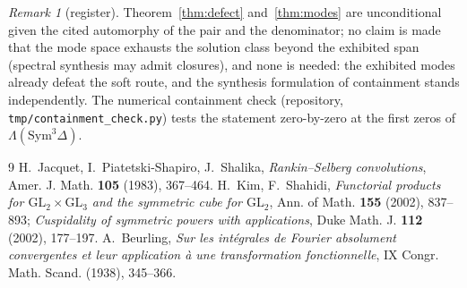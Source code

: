 \documentclass[11pt]{article}
\theoremstyle{remark}
\newtheorem{remark}[theorem]{Remark}
\newcommand{\Sym}{\mathrm{Sym}}
\begin{document}
\begin{remark}[register]
Theorem~\ref{thm:defect} and~\ref{thm:modes} are unconditional given the
cited automorphy of the pair and the denominator; no claim is made that the
mode space exhausts the solution class beyond the exhibited span (spectral
synthesis may admit closures), and none is needed: the exhibited modes
already defeat the soft route, and the synthesis formulation of containment
stands independently.  The numerical containment check (repository,
\texttt{tmp/containment\_check.py}) tests the statement zero-by-zero at the
first zeros of $\Lambda(\Sym^3\Delta)$.
\end{remark}

\begin{thebibliography}{9}
 H.~Jacquet, I.~Piatetski-Shapiro, J.~Shalika,
\emph{Rankin--Selberg convolutions}, Amer. J. Math. \textbf{105} (1983),
367--464.
 H.~Kim, F.~Shahidi, \emph{Functorial products for
$\mathrm{GL}_2\times\mathrm{GL}_3$ and the symmetric cube for
$\mathrm{GL}_2$}, Ann. of Math. \textbf{155} (2002), 837--893;
\emph{Cuspidality of symmetric powers with applications}, Duke Math. J.
\textbf{112} (2002), 177--197.
 A.~Beurling, \emph{Sur les int\'egrales de Fourier
absolument convergentes et leur application \`a une transformation
fonctionnelle}, IX Congr. Math. Scand. (1938), 345--366.
\end{thebibliography}
\end{document}

